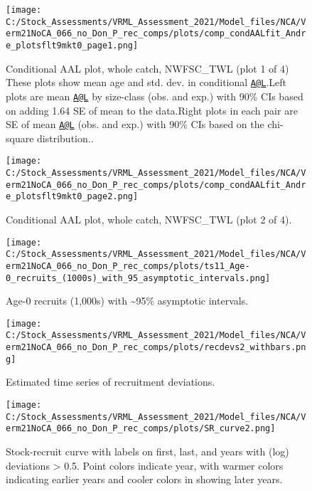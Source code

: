\documentclass[11pt,
  english,
  a4paper,
]{article}
\begin{document}
\begin{figure}
\centering
\texttt{[image: C:/Stock\_Assessments/VRML\_Assessment\_2021/Model\_files/NCA/Verm21NoCA\_066\_no\_Don\_P\_rec\_comps/plots/comp\_condAALfit\_Andre\_plotsflt9mkt0\_page1.png]}
\caption{Conditional AAL plot, whole catch, NWFSC\_TWL (plot 1 of 4) These plots show mean age and std. dev. in conditional {\href{mailto:A@L}{\nolinkurl{A@L}}\leavevmode\tagmcend\tagstructend}.Left plots are mean {\href{mailto:A@L}{\nolinkurl{A@L}}\leavevmode\tagmcend\tagstructend} by size-class (obs. and exp.) with 90\% CIs based on adding 1.64 SE of mean to the data.Right plots in each pair are SE of mean {\href{mailto:A@L}{\nolinkurl{A@L}}\leavevmode\tagmcend\tagstructend} (obs. and exp.) with 90\% CIs based on the chi-square distribution..\label{fig:comp_condAALfit_Andre_plotsflt9mkt0_page1}}
\end{figure}

\begin{figure}
\centering
\texttt{[image: C:/Stock\_Assessments/VRML\_Assessment\_2021/Model\_files/NCA/Verm21NoCA\_066\_no\_Don\_P\_rec\_comps/plots/comp\_condAALfit\_Andre\_plotsflt9mkt0\_page2.png]}
\caption{Conditional AAL plot, whole catch, NWFSC\_TWL (plot 2 of 4).\label{fig:comp_condAALfit_Andre_plotsflt9mkt0_page2}}
\end{figure}

\FloatBarrier

\begin{figure}
\centering
\texttt{[image: C:/Stock\_Assessments/VRML\_Assessment\_2021/Model\_files/NCA/Verm21NoCA\_066\_no\_Don\_P\_rec\_comps/plots/ts11\_Age-0\_recruits\_(1000s)\_with\_95\_asymptotic\_intervals.png]}
\caption{Age-0 recruits (1,000s) with \textasciitilde95\% asymptotic intervals.\label{fig:recruits}}
\end{figure}

\begin{figure}
\centering
\texttt{[image: C:/Stock\_Assessments/VRML\_Assessment\_2021/Model\_files/NCA/Verm21NoCA\_066\_no\_Don\_P\_rec\_comps/plots/recdevs2\_withbars.png]}
\caption{Estimated time series of recruitment deviations.\label{fig:rec-devs}}
\end{figure}

\begin{figure}
\centering
\texttt{[image: C:/Stock\_Assessments/VRML\_Assessment\_2021/Model\_files/NCA/Verm21NoCA\_066\_no\_Don\_P\_rec\_comps/plots/SR\_curve2.png]}
\caption{Stock-recruit curve with labels on first, last, and years with (log) deviations \textgreater{} 0.5. Point colors indicate year, with warmer colors indicating earlier years and cooler colors in showing later years.\label{fig:bh-curve}}
\end{figure}
\end{document}
